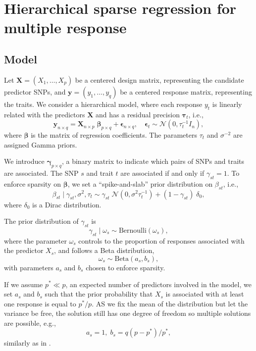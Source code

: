 \documentclass[a4paper, 11pt]{report}
\numberwithin{equation}{chapter}
\begin{document}
\newpage
\chapter{Hierarchical sparse regression for multiple response}
\section{Model}
Let $\boldsymbol{X }= (X_1,\ldots,X_p)$ be a centered design matrix, representing the candidate predictor SNPs, and $\boldsymbol{y} = (y_1,\ldots,y_q)$ be a centered response matrix, representing the traits. We consider a hierarchical model, where each response $y_t$ is linearly related with the predictors $\boldsymbol{X}$ and has a residual precision $\boldsymbol{\tau}_t$, i.e.,
\begin{equation*}
\label{eq:model}
\boldsymbol{y}_{n\times q} = \boldsymbol{X}_{n \times p}\;\boldsymbol{\beta}_{p \times q}+\boldsymbol{\epsilon}_{n \times q},\quad\boldsymbol{\epsilon}_t \sim \mathcal{N}(0,\tau_t^{-1}I_n),
\end{equation*}
where $\boldsymbol{\beta}$ is the matrix of regression coefficients. The parameters $\tau_t$ and $\sigma^{-2}$ are assigned Gamma priors.

We introduce $\boldsymbol{\gamma}_{p\times q}$, a binary matrix to indicate which pairs of SNPs and traits are associated. The SNP $s$ and trait $t$ are associated if and only if $\gamma_{st} = 1$. To enforce sparsity on $\boldsymbol{\beta}$, we set a ``spike-and-slab'' prior distribution on $\beta_{st}$, i.e.,
\begin{equation*}
\beta_{st} \mid \gamma_{st},\sigma^2, \tau_t \sim \gamma_{st}\;\mathcal{N}(0,\sigma^2\tau_t^{-1})+(1-\gamma_{st})\;\delta_0,
\end{equation*}
where $\delta_0$ is a Dirac distribution.

The prior distribution of $\gamma_{st}$ is
\begin{equation*}
\gamma_{st} \mid \omega_s \sim  \text{Bernoulli}(\omega_s),
\end{equation*}
where the parameter $\omega_s$ controls to the proportion of responses associated with the predictor $X_s$, and follows a Beta distribution,
\begin{equation*}
\omega_s \sim \text{Beta}(a_s, b_s),
\end{equation*}
with parameters $a_s$ and $b_s$ chosen to enforce sparsity.

If we assume $p^* \ll p$, an expected number of predictors involved in the model, we set $a_s$ and $b_s$ such that the prior probability that $X_s$ is associated with at least one response is equal to $p^*/p$. AS we fix the mean of the distribution but let the variance be free, the solution still has one degree of freedom so multiple solutions are possible, e.g.,
\begin{equation*}
a_s = 1,\;b_s = q(p-p^*)/p^*,
\end{equation*}
similarly as in \citep{bay_lin}.
\end{document}
